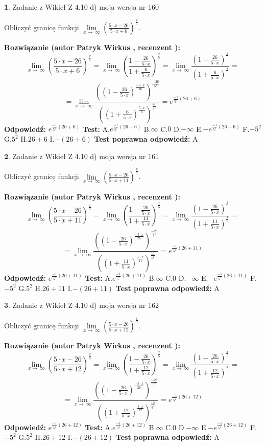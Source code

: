 \documentclass[12pt, a4paper]{article}
\theoremstyle{definition} %
\newtheorem{zad}{}
\newcommand{\zadStart}[1]{\begin{zad}#1\newline}
\newcommand{\zadStop}{\end{zad}}
\newcommand{\rozwStart}[2]{\noindent \textbf{Rozwiązanie (autor #1 , recenzent #2): }\newline}
\newcommand{\rozwStop}{\newline}
\newcommand{\odpStart}{\noindent \textbf{Odpowiedź:}\newline}
\newcommand{\odpStop}{\newline}
\newcommand{\testStart}{\noindent \textbf{Test:}\newline}
\newcommand{\testStop}{\newline}
\newcommand{\kluczStart}{\noindent \textbf{Test poprawna odpowiedź:}\newline}
\newcommand{\kluczStop}{\newline}
\begin{document}
\zadStart{Zadanie z Wikieł Z 4.10 d) moja wersja nr 160}


Obliczyć granicę funkcji  $\lim\limits_{x\to\ \infty}(\frac{5\cdot x-26}{5\cdot x+6})^{\frac{x}{5}}$.
\zadStop
\rozwStart{Patryk Wirkus}{}
$$\lim\limits_{x\to\ \infty}(\frac{5\cdot x-26}{5\cdot x+6})^{\frac{x}{5}} = \lim\limits_{x\to\ \infty}(\frac{1-\frac{26}{5\cdot x}}{1+\frac{6}{5\cdot x}})^{\frac{x}{5}}=\lim\limits_{x\to\ \infty}\frac{(1-\frac{26}{5\cdot x})^{\frac{x}{5}}}{(1+\frac{6}{5\cdot x})^{\frac{x}{5}}}=$$
$$=\lim\limits_{x\to\ \infty}\frac{((1-\frac{26}{5\cdot x})^{\frac{-5\cdot x}{26}})^{\frac{-26}{5^{2}}}}{((1+\frac{6}{5\cdot x})^{\frac{5\cdot x}{6}})^{\frac{6}{5^{2}}}}=e^{\frac{-1}{5^{2}}(26+6)}$$
\rozwStop
\odpStart
$e^{\frac{-1}{5^{2}}(26+6)}$
\odpStop
\testStart
A.$e^{\frac{-1}{5^{2}}(26+6)}$ B.$\infty$ C.$0$ D.$-\infty$ E.$-e^{\frac{-1}{5^{2}}(26+6)}$
F.$-5^{2}$ G.$5^{2}$
H.$26+6$
I.$-(26+6)$
\testStop
\kluczStart
A
\kluczStop



\zadStart{Zadanie z Wikieł Z 4.10 d) moja wersja nr 161}


Obliczyć granicę funkcji  $\lim\limits_{x\to\ \infty}(\frac{5\cdot x-26}{5\cdot x+11})^{\frac{x}{5}}$.
\zadStop
\rozwStart{Patryk Wirkus}{}
$$\lim\limits_{x\to\ \infty}(\frac{5\cdot x-26}{5\cdot x+11})^{\frac{x}{5}} = \lim\limits_{x\to\ \infty}(\frac{1-\frac{26}{5\cdot x}}{1+\frac{11}{5\cdot x}})^{\frac{x}{5}}=\lim\limits_{x\to\ \infty}\frac{(1-\frac{26}{5\cdot x})^{\frac{x}{5}}}{(1+\frac{11}{5\cdot x})^{\frac{x}{5}}}=$$
$$=\lim\limits_{x\to\ \infty}\frac{((1-\frac{26}{5\cdot x})^{\frac{-5\cdot x}{26}})^{\frac{-26}{5^{2}}}}{((1+\frac{11}{5\cdot x})^{\frac{5\cdot x}{11}})^{\frac{11}{5^{2}}}}=e^{\frac{-1}{5^{2}}(26+11)}$$
\rozwStop
\odpStart
$e^{\frac{-1}{5^{2}}(26+11)}$
\odpStop
\testStart
A.$e^{\frac{-1}{5^{2}}(26+11)}$ B.$\infty$ C.$0$ D.$-\infty$ E.$-e^{\frac{-1}{5^{2}}(26+11)}$
F.$-5^{2}$ G.$5^{2}$
H.$26+11$
I.$-(26+11)$
\testStop
\kluczStart
A
\kluczStop



\zadStart{Zadanie z Wikieł Z 4.10 d) moja wersja nr 162}


Obliczyć granicę funkcji  $\lim\limits_{x\to\ \infty}(\frac{5\cdot x-26}{5\cdot x+12})^{\frac{x}{5}}$.
\zadStop
\rozwStart{Patryk Wirkus}{}
$$\lim\limits_{x\to\ \infty}(\frac{5\cdot x-26}{5\cdot x+12})^{\frac{x}{5}} = \lim\limits_{x\to\ \infty}(\frac{1-\frac{26}{5\cdot x}}{1+\frac{12}{5\cdot x}})^{\frac{x}{5}}=\lim\limits_{x\to\ \infty}\frac{(1-\frac{26}{5\cdot x})^{\frac{x}{5}}}{(1+\frac{12}{5\cdot x})^{\frac{x}{5}}}=$$
$$=\lim\limits_{x\to\ \infty}\frac{((1-\frac{26}{5\cdot x})^{\frac{-5\cdot x}{26}})^{\frac{-26}{5^{2}}}}{((1+\frac{12}{5\cdot x})^{\frac{5\cdot x}{12}})^{\frac{12}{5^{2}}}}=e^{\frac{-1}{5^{2}}(26+12)}$$
\rozwStop
\odpStart
$e^{\frac{-1}{5^{2}}(26+12)}$
\odpStop
\testStart
A.$e^{\frac{-1}{5^{2}}(26+12)}$ B.$\infty$ C.$0$ D.$-\infty$ E.$-e^{\frac{-1}{5^{2}}(26+12)}$
F.$-5^{2}$ G.$5^{2}$
H.$26+12$
I.$-(26+12)$
\testStop
\kluczStart
A
\kluczStop
\end{document}
